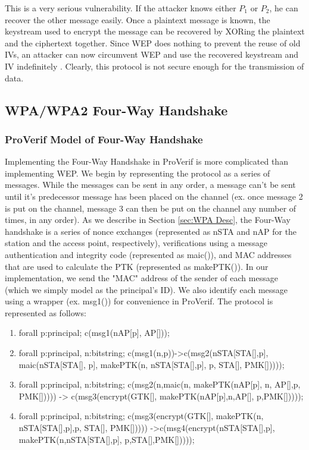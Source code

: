 \documentclass[11pt, twocolumn]{article} %
\begin{document}
{This is a very serious vulnerability.  If the attacker knows either $P_1$ or $P_2$, he can recover the other message easily.  Once a plaintext message is known, the keystream used to encrypt the message can be recovered by XORing the plaintext and the ciphertext together.  Since WEP does nothing to prevent the reuse of old IVs, an attacker can now circumvent WEP and use the recovered keystream and IV indefinitely \cite{borisov01}.  Clearly, this protocol is not secure enough for the transmission of data.

\subsection{WPA/WPA2 Four-Way Handshake}
\subsubsection{ProVerif Model of Four-Way Handshake}
Implementing the Four-Way Handshake in ProVerif is more complicated than implementing WEP.  We begin by representing the protocol as a series of messages.  While the messages can be sent in any order, a message can't be sent until it's predecessor message has been placed on the channel (ex. once message 2 is put on the channel, message 3 can then be put on the channel any number of times, in any order). As we describe in Section \ref{sec:WPA Desc}, the Four-Way handshake is a series of nonce exchanges (represented as nSTA and nAP for the station and the access point, respectively), verifications using a message authentication and integrity code (represented as maic()), and MAC addresses that are used to calculate the PTK (represented as makePTK()).  In our implementation, we send the "MAC" address of the sender of each message (which we simply model as the principal's ID).  We also identify each message using a wrapper (ex. msg1()) for convenience in ProVerif.  The protocol is represented as follows:
\begin{enumerate}[leftmargin=4mm]
\item
\begin{verbatimtab}[2]
forall p:principal; c(msg1(nAP[p], AP[]));
\end{verbatimtab}
\item
\begin{verbatimtab}[2]
forall p:principal, n:bitstring; 
	c(msg1(n,p))->c(msg2(nSTA[STA[],p], 
		maic(nSTA[STA[], p], 
			makePTK(n, nSTA[STA[],p],
				p, STA[], PMK[]))));
\end{verbatimtab}
\item
\begin{verbatimtab}[2]
forall p:principal, n:bitstring; 
	c(msg2(n,maic(n, makePTK(nAP[p],
		n, AP[],p, PMK[])))) -> 
			c(msg3(encrypt(GTK[], 
				makePTK(nAP[p],n,AP[],
					p,PMK[]))));
\end{verbatimtab}
\item
\begin{verbatimtab}[2]
forall p:principal, n:bitstring; 
	c(msg3(encrypt(GTK[], makePTK(n,
		nSTA[STA[],p],p, STA[], PMK[])))) 
			->c(msg4(encrypt(nSTA[STA[],p],
					makePTK(n,nSTA[STA[],p],
						p,STA[],PMK[]))));
\end{verbatimtab}
\end{enumerate}

}
\end{document}
